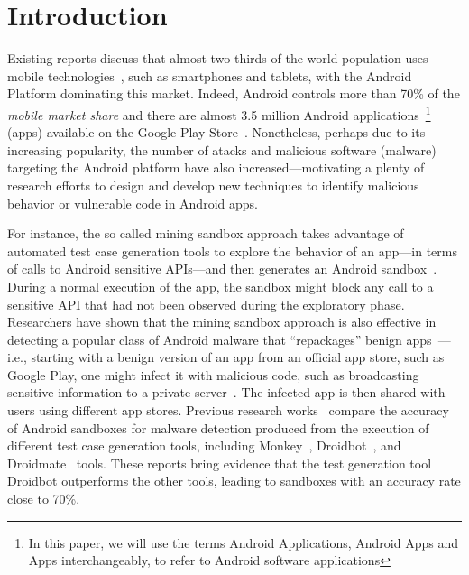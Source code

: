 \section{Introduction}\label{sec:introduction}

Existing reports discuss that almost two-thirds of the world population
uses mobile technologies~\cite{Comscore,DBLP:journals/tse/MartinSJZH17}, such as smartphones and tablets, with the
Android Platform dominating this market. Indeed, Android controls more than 70\% of the \emph{mobile
market share} and there are almost 3.5 million Android applications~\footnote{In this paper, we will use the terms Android Applications, Android Apps and Apps interchangeably, to refer to Android software applications} (apps)
available on the Google Play Store~\cite{Statista}. 
Nonetheless, perhaps due to its increasing popularity, the number of atacks and  
malicious software (malware) targeting the Android platform have also
increased---motivating a plenty of research efforts to design and develop new techniques
to identify malicious behavior or vulnerable code in Android apps.

For instance, the so called
mining sandbox approach takes advantage of automated test case generation tools 
to explore the behavior of an app---in terms of calls to Android sensitive APIs---and then
generates an Android sandbox~\cite{DBLP:conf/icse/JamrozikSZ16}. During a normal
execution of the app, the sandbox might block any call to a sensitive API
that had not been observed during the exploratory phase. 
Researchers have shown that the mining sandbox approach is also effective
in detecting a popular class of Android malware that ``repackages'' benign apps~\cite{DBLP:conf/wcre/BaoLL18,le2018towards}---i.e., starting with a benign version of an app from an official app store, such as Google Play, one might infect it with
malicious code, such as broadcasting
sensitive information to a private server~\cite{DBLP:journals/tse/LiBK21}. The infected app is then
shared with users using different app stores. 
Previous research works~\cite{DBLP:conf/wcre/BaoLL18,DBLP:journals/jss/CostaMMSSBNR22} compare the accuracy of Android sandboxes for malware detection 
produced from the execution of different test case generation tools, including Monkey~\cite{Monkey}, Droidbot~\cite{DBLP:conf/icse/LiYGC17}, and Droidmate~\cite{DBLP:conf/kbse/BorgesHZ18} tools.
These reports bring evidence that the test generation tool Droidbot outperforms the other tools, leading to sandboxes with an accuracy
rate close to 70\%. 

